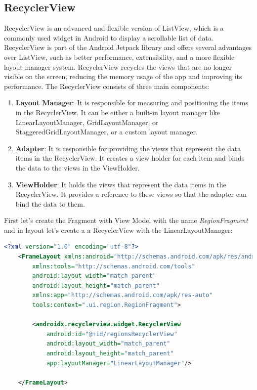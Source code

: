\documentclass[a4paper, 12pt]{article}
\begin{document}
\subsection{RecyclerView}

RecyclerView is an advanced and flexible version of ListView, which is a commonly used widget in Android to display a scrollable list of data. RecyclerView 
is part of the Android Jetpack library and offers several advantages over ListView, such as better performance, extensibility, 
and a more flexible layout manager system. RecyclerView recycles the views that are no longer visible on the screen, 
reducing the memory usage of the app and improving its performance.
The RecyclerView consists of three main components:
\begin{enumerate}
    \item \textbf{Layout Manager}: It is responsible for measuring and positioning the items in the RecyclerView. It can be either a built-in layout manager like LinearLayoutManager, GridLayoutManager, or StaggeredGridLayoutManager, or a custom layout manager.
    \item \textbf{Adapter}: It is responsible for providing the views that represent the data items in the RecyclerView. It creates a view holder for each item and binds the data to the views in the ViewHolder.
    \item \textbf{ViewHolder}: It holds the views that represent the data items in the RecyclerView. It provides a reference to these views so that the adapter can bind the data to them.
\end{enumerate}

First let's create the Fragment with View Model with the name \textit{RegionFragment} and in layout let's create a a RecyclerView with the LinearLayoutManager:

\begin{lstlisting}[caption={Region Fragment Layout.}, label={code:screen_region_list}, language=XML]
    <?xml version="1.0" encoding="utf-8"?>
    <FrameLayout xmlns:android="http://schemas.android.com/apk/res/android"
        xmlns:tools="http://schemas.android.com/tools"
        android:layout_width="match_parent"
        android:layout_height="match_parent"
        xmlns:app="http://schemas.android.com/apk/res-auto"
        tools:context=".ui.region.RegionFragment">
    
        <androidx.recyclerview.widget.RecyclerView
            android:id="@+id/regionsRecyclerView"
            android:layout_width="match_parent"
            android:layout_height="match_parent"
            app:layoutManager="LinearLayoutManager"/>
    
    </FrameLayout>
\end{lstlisting}
\end{document}
